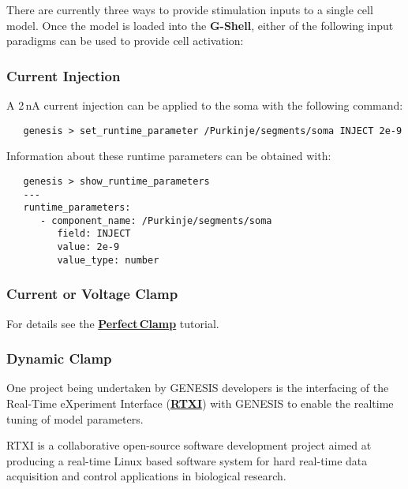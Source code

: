 \documentclass[12pt]{article}
\begin{document}
There are currently three ways to provide stimulation inputs to a single cell model. Once the model is loaded into the {\bf G-Shell}, either of the following input paradigms can be used to provide cell activation:

\subsubsection*{Current Injection}

A 2\,nA current injection can be applied to the soma with the following command:
\begin{verbatim}
   genesis > set_runtime_parameter /Purkinje/segments/soma INJECT 2e-9
\end{verbatim}

Information about these runtime parameters can be obtained with:
\begin{verbatim}
   genesis > show_runtime_parameters
   ---
   runtime_parameters:
      - component_name: /Purkinje/segments/soma
         field: INJECT
         value: 2e-9
         value_type: number
\end{verbatim}

\subsubsection*{Current or Voltage Clamp}

For details see the \href{../pclamp/pclamp.tex}{\bf Perfect\,Clamp} tutorial.

\subsubsection*{Dynamic Clamp}

One project being undertaken by GENESIS developers is the interfacing of the Real-Time eXperiment Interface (\href{http://www.rtxi.org/}{\bf RTXI}) with GENESIS to enable the realtime tuning of model parameters.

RTXI is a collaborative open-source software development project aimed at producing a real-time Linux based software system for hard real-time data acquisition and control applications in biological research. \\
\end{document}
